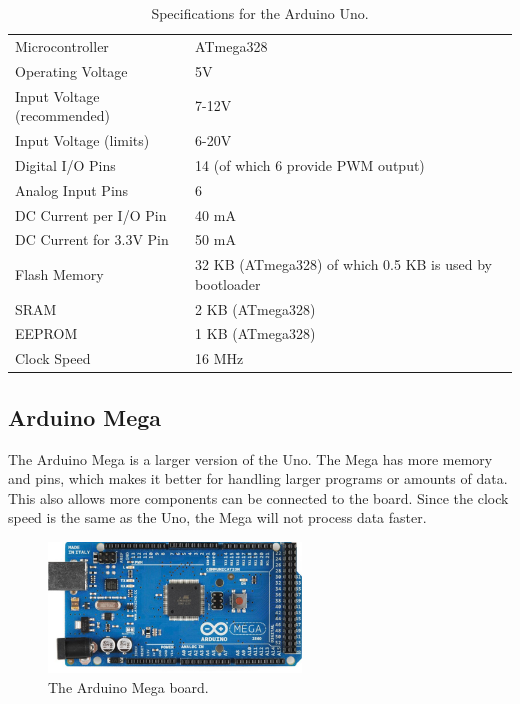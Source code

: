 \begin{table}
\begin{tabular}{| l | l |}
\hline
Microcontroller & ATmega328\\
Operating Voltage & 5V\\
Input Voltage (recommended) & 7-12V\\
Input Voltage (limits) & 6-20V\\
Digital I/O Pins & 14 (of which 6 provide PWM output)\\
Analog Input Pins & 6\\
DC Current per I/O Pin & 40 mA\\
DC Current for 3.3V Pin & 50 mA\\
Flash Memory & 32 KB (ATmega328) of which 0.5 KB is used by bootloader\\
SRAM & 2 KB (ATmega328)\\
EEPROM & 1 KB (ATmega328)\\
Clock Speed & 16 MHz\\
\hline
\end{tabular}
\caption{Specifications for the Arduino Uno\cite{arduinouno}.}
\end{table}
\label{tab:unospec}

\subsection{Arduino Mega}
The Arduino Mega is a larger version of the Uno. The Mega has more memory and pins, which makes it better for handling larger programs or amounts of data. This also allows more components can be connected to the board. Since the clock speed is the same as the Uno, the Mega will not process data faster.

\begin{figure}[h!]
\centering
\includegraphics[width=0.6\textwidth]{chapters/analysis/figs/ArduinoMega.jpg}
\caption{The Arduino Mega board\cite{arduinomegaimg}.}
\label{fig:arduinomega}
\end{figure}

